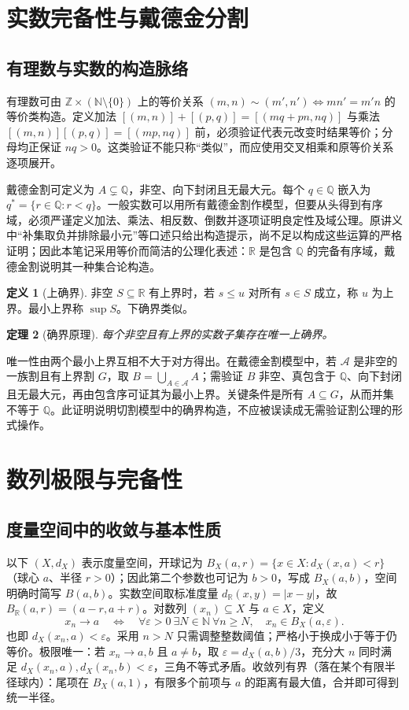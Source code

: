 \documentclass[11pt,a4paper,UTF8]{ctexart}
\newtheorem{theorem}{定理}[section]
\theoremstyle{definition}\newtheorem{definition}[theorem]{定义}
\theoremstyle{remark}\newtheorem{remark}[theorem]{说明}
\begin{document}
\section{实数完备性与戴德金分割}
\subsection{有理数与实数的构造脉络}
有理数可由 $\mathbb Z\times(\mathbb N\setminus\{0\})$ 上的等价关系 $(m,n)\sim(m',n')\iff mn'=m'n$ 的等价类构造。定义加法 $[(m,n)]+[(p,q)]=[(mq+pn,nq)]$ 与乘法 $[(m,n)][(p,q)]=[(mp,nq)]$ 前，必须验证代表元改变时结果等价；分母均正保证 $nq>0$。这类验证不能只称“类似”，而应使用交叉相乘和原等价关系逐项展开。

戴德金割可定义为 $A\subsetneq\mathbb Q$，非空、向下封闭且无最大元。每个 $q\in\mathbb Q$ 嵌入为 $q^*=\{r\in\mathbb Q:r<q\}$。一般实数可以用所有戴德金割作模型，但要从头得到有序域，必须严谨定义加法、乘法、相反数、倒数并逐项证明良定性及域公理。原讲义中“补集取负并排除最小元”等口述只给出构造提示，尚不足以构成这些运算的严格证明；因此本笔记采用等价而简洁的公理化表述：$\mathbb R$ 是包含 $\mathbb Q$ 的完备有序域，戴德金割说明其一种集合论构造。

\begin{definition}[上确界]
非空 $S\subseteq\mathbb R$ 有上界时，若 $s\le u$ 对所有 $s\in S$ 成立，称 $u$ 为上界。最小上界称 $\sup S$。下确界类似。
\end{definition}
\begin{theorem}[确界原理]
每个非空且有上界的实数子集存在唯一上确界。
\end{theorem}
唯一性由两个最小上界互相不大于对方得出。在戴德金割模型中，若 $\mathcal A$ 是非空的一族割且有上界割 $G$，取 $B=\bigcup_{A\in\mathcal A}A$；需验证 $B$ 非空、真包含于 $\mathbb Q$、向下封闭且无最大元，再由包含序可证其为最小上界。关键条件是所有 $A\subseteq G$，从而并集不等于 $\mathbb Q$。此证明说明切割模型中的确界构造，不应被误读成无需验证割公理的形式操作。

\section{数列极限与完备性}
\subsection{度量空间中的收敛与基本性质}
以下 $(X,d_X)$ 表示度量空间，开球记为 $B_X(a,r)=\{x\in X:d_X(x,a)<r\}$（球心 $a$、半径 $r>0$）；因此第二个参数也可记为 $b>0$，写成 $B_X(a,b)$，空间明确时简写 $B(a,b)$。实数空间取标准度量 $d_{\mathbb R}(x,y)=|x-y|$，故 $B_{\mathbb R}(a,r)=(a-r,a+r)$。对数列 $(x_n)\subseteq X$ 与 $a\in X$，定义
\[
x_n\longrightarrow a\quad\Longleftrightarrow\quad
\forall\varepsilon>0\ \exists N\in\mathbb N\ \forall n\ge N,\quad x_n\in B_X(a,\varepsilon).
\]
也即 $d_X(x_n,a)<\varepsilon$。采用 $n>N$ 只需调整整数阈值；严格小于换成小于等于仍等价。极限唯一：若 $x_n\to a,b$ 且 $a\ne b$，取 $\varepsilon=d_X(a,b)/3$，充分大 $n$ 同时满足 $d_X(x_n,a),d_X(x_n,b)<\varepsilon$，三角不等式矛盾。收敛列有界（落在某个有限半径球内）：尾项在 $B_X(a,1)$，有限多个前项与 $a$ 的距离有最大值，合并即可得到统一半径。
\end{document}
